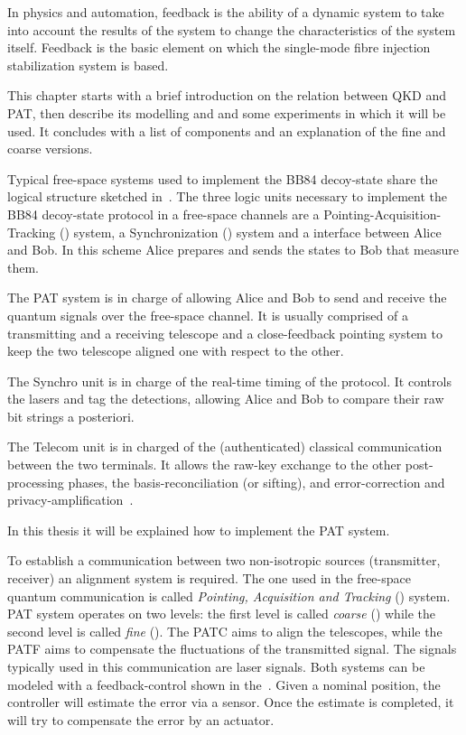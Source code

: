 In physics and automation, feedback is the ability of a dynamic system to take into account the results of the system to change the characteristics of the system itself. Feedback is the basic element on which the single-mode fibre injection stabilization system is based.

This chapter starts with a brief introduction on the relation between QKD and PAT, then describe its modelling and and some experiments in which it will be used. It concludes with a list of components and an explanation of the fine and coarse versions.


Typical free-space systems used to implement the BB84 decoy-state share the logical structure sketched in~. The three logic units necessary to implement the BB84 decoy-state protocol in a free-space channels are a Pointing-Acquisition-Tracking () system, a Synchronization () system and a  interface between Alice and Bob. In this scheme  Alice prepares and sends the states to Bob that measure them.

The PAT system is in charge of allowing Alice and Bob to send and receive the quantum signals over the free-space channel. It is usually comprised of a transmitting and a receiving telescope and a close-feedback pointing system to keep the two telescope aligned one with respect to the other.

The Synchro unit is in charge of the real-time timing of the protocol. It controls the lasers and tag the detections, allowing Alice and Bob to compare their raw bit strings a posteriori.

The Telecom unit is in charged of the (authenticated) classical communication between the two terminals. It allows the raw-key exchange to the other post-processing phases, the basis-reconciliation (or sifting), and error-correction and privacy-amplification~\cite{a9}.

In this thesis it will be explained how to implement the PAT system.

To establish a communication between two non-isotropic sources (transmitter, receiver) an alignment system is required. The one used in the free-space quantum communication is called \textit{Pointing, Acquisition and Tracking} () system. PAT system operates on two levels: the first level is called \textit{coarse} () while the second level is called \textit{fine} ().
The PATC aims to align the telescopes, while the PATF aims to compensate the fluctuations of the transmitted signal. The signals typically used in this communication are laser signals. Both systems can be modeled with a feedback-control shown in the~.
Given a nominal position, the controller will estimate the error via a sensor. Once the estimate is completed, it will try to compensate the error by an actuator.

